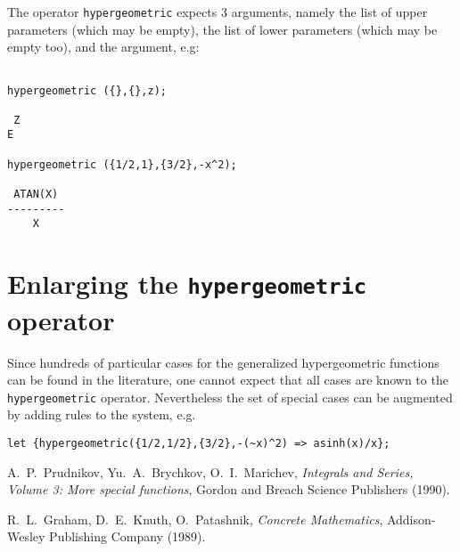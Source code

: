 The operator {\tt hypergeometric} expects 3 arguments, namely the 
list of upper parameters (which may be empty), the list of lower
parameters (which may be empty too), and the argument, e.g:

\begin{verbatim}

hypergeometric ({},{},z);

 Z
E

hypergeometric ({1/2,1},{3/2},-x^2);

 ATAN(X)
---------
    X
\end{verbatim}

\section{Enlarging the {\tt hypergeometric} operator}

Since hundreds of particular cases for the generalized hypergeometric
functions can be found in the literature, one cannot expect that all
cases are known to the {\tt hypergeometric} operator.
Nevertheless the set of special cases can be augmented by adding
rules to the \REDUCE{} system, e.g.

\begin{verbatim}
let {hypergeometric({1/2,1/2},{3/2},-(~x)^2) => asinh(x)/x};
\end{verbatim}

\begin{thebibliography}{9}

 A.~P.~Prudnikov, Yu.~A.~Brychkov, O.~I.~Marichev,
{\em Integrals and Series, Volume 3: More special functions},
Gordon and Breach Science Publishers (1990).

 R.~L.~Graham, D.~E.~Knuth, O.~Patashnik,
{\em Concrete Mathematics}, Addison-Wesley Publishing Company (1989).

\end{thebibliography}

